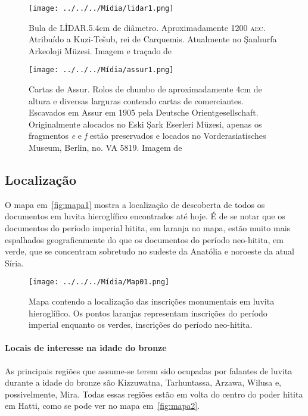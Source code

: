 \begin{figure}[htb]
	\begin{center}
		\texttt{[image: ../../../Mídia/lidar1.png]}
	\end{center}
	\caption[Bula de LİDAR]{Bula de LİDAR.\@ 5.4cm de diâmetro. Aproximadamente
		1200 \textsc{aec}. Atribuído a Kuzi-Tešub, rei de Carquemis.
		Atualmente no Şanlıurfa Arkeoloji Müzesi.
		Imagem e traçado de~\citet[\emph{plate} 328]{CHLI13}}\label{fig:lidar1}
	\begin{center}
		\texttt{[image: ../../../Mídia/assur1.png]}
	\end{center}
	\caption[Cartas de Assur]{Cartas de Assur. Rolos de chumbo de aproximadamente 4cm de altura e
		diversas larguras contendo cartas de comerciantes.
		Escavados em Assur em 1905 pela Deutsche Orientgesellschaft.
		Originalmente alocados no Eski Şark Eserleri Müzesi, apenas os
		fragmentos \emph{e} e \emph{f} estão preservados e locados no
		Vorderasiatisches Museum, Berlin, no. VA 5819.
		Imagem de~\citet[\emph{plate} 306]{CHLI13}
	}\label{fig:assur1}
\end{figure}

\clearpage

\subsection{Localização}

O mapa em~\autoref{fig:mapa1} mostra a localização de descoberta de todos os
documentos em luvita hieroglífico encontrados até hoje.
É de se notar que os documentos do período imperial hitita, em laranja no
mapa, estão muito mais espalhados geograficamente do que os documentos do
período neo-hitita, em verde, que se concentram sobretudo no sudeste da Anatólia
e noroeste da atual Síria.

\begin{figure}[ht!]
	\begin{center}
		\texttt{[image: ../../../Mídia/Map01.png]}
	\end{center}
	\caption[Mapa das inscrições monumentais]{Mapa contendo a localização das
		inscrições monumentais em luvita hieroglífico. Os pontos laranjas
		representam inscrições do período imperial enquanto os verdes, inscrições do
		período neo-hitita.}\label{fig:mapa1}
\end{figure}

\paragraph{Locais de interesse na idade do bronze}
As principais regiões que assume-se terem sido ocupadas por falantes de luvita
durante a idade do bronze são Kizzuwatna, Tarhuntassa, Arzawa, Wilusa e,
possivelmente, Mira.
Todas essas regiões estão em volta do centro do poder hitita em Hatti, como se
pode ver no mapa em~\autoref{fig:mapa2}.

